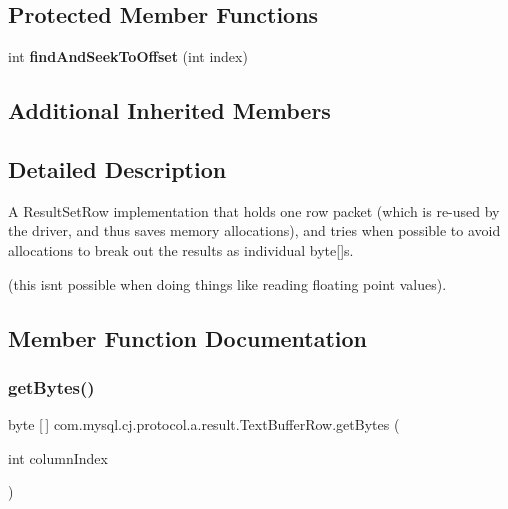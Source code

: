 \subsection*{Protected Member Functions}
\begin{DoxyCompactItemize}
\item 
\mbox{\label{classcom_1_1mysql_1_1cj_1_1protocol_1_1a_1_1result_1_1_text_buffer_row_a3d450230d8439eb5e1462b9f75b2714c}} 
int {\bfseries find\+And\+Seek\+To\+Offset} (int index)
\end{DoxyCompactItemize}
\subsection*{Additional Inherited Members}


\subsection{Detailed Description}
A Result\+Set\+Row implementation that holds one row packet (which is re-\/used by the driver, and thus saves memory allocations), and tries when possible to avoid allocations to break out the results as individual byte\mbox{[}\mbox{]}s.

(this isn\textquotesingle{}t possible when doing things like reading floating point values). 

\subsection{Member Function Documentation}
\mbox{\label{classcom_1_1mysql_1_1cj_1_1protocol_1_1a_1_1result_1_1_text_buffer_row_a54253c1dda65ca0c96dc3ca1adf4b908}} 
\subsubsection{\texorpdfstring{get\+Bytes()}{getBytes()}}
{\footnotesize\ttfamily byte \mbox{[}$\,$\mbox{]} com.\+mysql.\+cj.\+protocol.\+a.\+result.\+Text\+Buffer\+Row.\+get\+Bytes (\begin{DoxyParamCaption}\item[{int}]{column\+Index }\end{DoxyParamCaption})}

